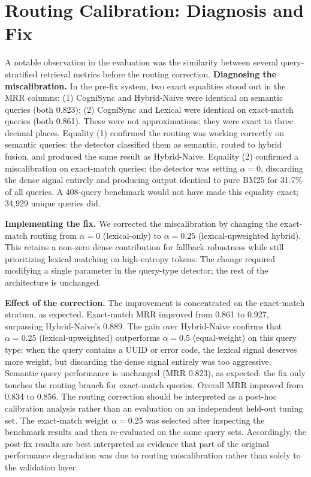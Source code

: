 \documentclass[sigconf]{acmart}
\begin{document}
\section{Routing Calibration: Diagnosis and Fix}
\label{sec:routing}

A notable observation in the evaluation was the similarity between several query-stratified retrieval metrics before the routing correction. 
\textbf{Diagnosing the miscalibration.} In the pre-fix system, two exact
equalities stood out in the MRR columns: (1) CogniSync and Hybrid-Naive
were identical on semantic queries (both 0.823); (2) CogniSync and Lexical
were identical on exact-match queries (both 0.861). These were not
approximations; they were exact to three decimal places. Equality (1)
confirmed the routing was working correctly on semantic queries: the
detector classified them as semantic, routed to hybrid fusion, and produced
the same result as Hybrid-Naive. Equality (2) confirmed a miscalibration
on exact-match queries: the detector was setting $\alpha = 0$, discarding
the dense signal entirely and producing output identical to pure BM25
for 31.7\% of all queries. A 408-query benchmark would not have made
this equality exact; 34,929 unique queries did.

\textbf{Implementing the fix.} We corrected the miscalibration by changing
the exact-match routing from $\alpha = 0$ (lexical-only) to $\alpha = 0.25$
(lexical-upweighted hybrid). This retains a non-zero dense contribution
for fallback robustness while still prioritizing lexical matching on
high-entropy tokens. The change required modifying a single parameter in
the query-type detector; the rest of the architecture is unchanged.

\textbf{Effect of the correction.} The improvement is concentrated on
the exact-match stratum, as expected. Exact-match MRR improved from 0.861
to 0.927, surpassing Hybrid-Naive's 0.889. The gain over Hybrid-Naive
confirms that $\alpha = 0.25$ (lexical-upweighted) outperforms $\alpha = 0.5$
(equal-weight) on this query type: when the query contains a UUID or error
code, the lexical signal deserves more weight, but discarding the dense
signal entirely was too aggressive. Semantic query performance is unchanged
(MRR 0.823), as expected: the fix only touches the routing branch for
exact-match queries. Overall MRR improved from 0.834 to 0.856. The routing correction should be interpreted as a post-hoc calibration
analysis rather than an evaluation on an independent held-out tuning set.
The exact-match weight $\alpha = 0.25$ was selected after inspecting the
benchmark results and then re-evaluated on the same query sets.
Accordingly, the post-fix results are best interpreted as evidence that
part of the original performance degradation was due to routing
miscalibration rather than solely to the validation layer.
\end{document}
